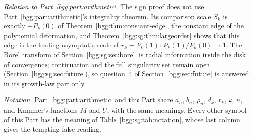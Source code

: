 \documentclass[11pt,a4paper]{article}
\numberwithin{equation}{section}
\theoremstyle{definition}
\theoremstyle{remark}
\theoremstyle{definition}
\begin{document}
\emph{Relation to Part~\ref{bgg:part:arithmetic}.} The sign proof does
not use Part~\ref{bgg:part:arithmetic}'s integrality theorem. Its
comparison scale $S_k$ is exactly $-P_k(0)$ of
Theorem~\ref{bgg:thm:constant-edge}, the constant edge of the polynomial
deformation, and Theorem~\ref{bgg:sg:thm:largeorder} shows that this
edge is the leading asymptotic scale of $r_k=P_k(1)$:
$P_k(1)/P_k(0)\to1$. The Borel transform of
Section~\ref{bgg:sg:sec:borel} is radial information inside the disk of
convergence; continuation and the full singularity set remain open
(Section~\ref{bgg:sg:sec:future}), so question~4 of
Section~\ref{bgg:sec:future} is answered in its growth-law part only.

\emph{Notation.} Part~\ref{bgg:part:arithmetic} and this Part share
$a_n$, $b_n$, $\rho_n$, $d_k$, $r_k$, $k$, $n$, and Kummer's functions $M$
and $U$, with the same meanings. Every other symbol of this Part has
the meaning of Table~\ref{bgg:sg:tab:notation}, whose last column gives
the tempting false reading.
\end{document}
